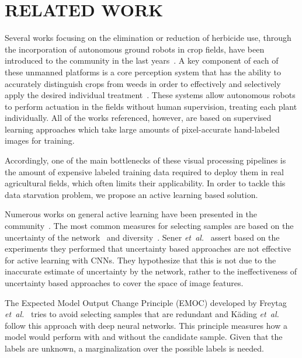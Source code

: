 \documentclass[letterpaper, 10 pt, conference]{ieeeconf}  %
\newcommand\etal{\emph{et~al.}}
\begin{document}
\section{RELATED WORK}
\label{sec:related}



Several works focusing on the elimination or reduction of herbicide use,
through the incorporation of autonomous ground robots in crop fields, have
been introduced to the community in the last years~\cite{ducket2018arxiv,liebisch2016wslw,mccool2018ral}.
A key component of each of these unmanned platforms is a core perception system that
has the ability to accurately distinguish crops from weeds in order to effectively
and selectively apply the desired individual treatment~\cite{lottes2018iros, mccool2017ral,milioto2017uavg,milioto2018real,sa2018rs}.
These systems allow autonomous robots to perform actuation in the fields without human supervision, treating each plant individually.
All of the works referenced, however, are based on supervised learning approaches which take large amounts of pixel-accurate hand-labeled images for training. 

Accordingly, one of the main bottlenecks of these visual processing pipelines is the amount of expensive labeled training data required to deploy them in real agricultural fields, which often limits their applicability. In order to tackle this data starvation problem, we propose an active learning based solution.

Numerous works on general active learning have been presented in the community~\cite{settles2009active,guyon2011results,holub2008entropy, yoo2019learning}. The most common measures for selecting samples are based on the uncertainty of the network~\cite{zhou2017fine, yang2017suggestive, gal2017deep, wang2017cost} and diversity~\cite{zhou2017fine, dutt2016active, kading2016active}.  Sener \etal~\cite{sener2017geometric} assert based on the experiments they performed that uncertainty based approaches are not effective for active learning with CNNs. They hypothesize that this is not due to the inaccurate estimate of uncertainty by the network, rather to the ineffectiveness of uncertainty based approaches to cover the space of image features.

The Expected Model Output Change Principle (EMOC) developed by Freytag \etal~\cite{freytag2014selecting} tries to avoid selecting samples that are redundant and K{\"a}ding \etal~\cite{kading2016active} follow this approach with deep neural networks. This principle measures how a model would perform with and without the candidate sample. Given that the labels are unknown, a marginalization over the possible labels is needed. %
\end{document}
